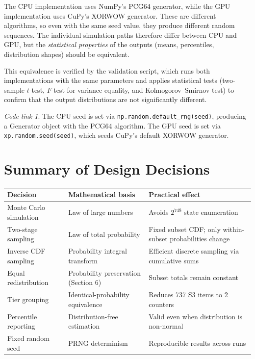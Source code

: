 \documentclass[11pt,a4paper]{article}
\theoremstyle{remark}
\newtheorem*{codelink}{Code link}
\begin{document}
The CPU implementation uses NumPy's PCG64 generator, while the GPU implementation uses CuPy's XORWOW generator. These are different algorithms, so even with the same seed value, they produce different random sequences. The individual simulation paths therefore differ between CPU and GPU, but the \emph{statistical properties} of the outputs (means, percentiles, distribution shapes) should be equivalent.

This equivalence is verified by the validation script, which runs both implementations with the same parameters and applies statistical tests (two-sample $t$-test, $F$-test for variance equality, and Kolmogorov--Smirnov test) to confirm that the output distributions are not significantly different.

\begin{codelink}
The CPU seed is set via \texttt{np.random.default\_rng(seed)}, producing a Generator object with the PCG64 algorithm. The GPU seed is set via \texttt{xp.random.seed(seed)}, which seeds CuPy's default XORWOW generator.
\end{codelink}

\section{Summary of Design Decisions}

\begin{center}
\begin{tabular}{@{}p{4.2cm}p{4cm}p{5.5cm}@{}}
\toprule
\textbf{Decision} & \textbf{Mathematical basis} & \textbf{Practical effect} \\
\midrule
Monte Carlo simulation & Law of large numbers & Avoids $2^{748}$ state enumeration \\[4pt]
Two-stage sampling & Law of total probability & Fixed subset CDF; only within-subset probabilities change \\[4pt]
Inverse CDF sampling & Probability integral transform & Efficient discrete sampling via cumulative sums \\[4pt]
Equal redistribution & Probability preservation (Section 6) & Subset totals remain constant \\[4pt]
Tier grouping & Identical-probability equivalence & Reduces 737 S3 items to 2 counters \\[4pt]
Percentile reporting & Distribution-free estimation & Valid even when distribution is non-normal \\[4pt]
Fixed random seed & PRNG determinism & Reproducible results across runs \\
\bottomrule
\end{tabular}
\end{center}
\end{document}
